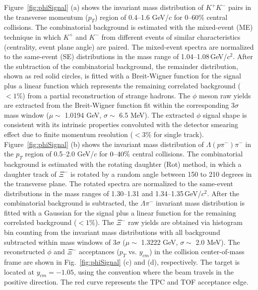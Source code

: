 \documentclass[aps,tightenlines,superscriptaddress,twocolumn]{revtex4-1}
\begin{document}
Figure~\ref{fig:phiSignal} (a) shows the invariant mass distribution of $K^+K^-$ pairs in the transverse momentum ($p_{T}$) region of 0.4--1.6 GeV/$c$ for 0--60\% central collisions. The combinatorial background is estimated with the mixed-event (ME) technique in which $K^+$ and $K^-$ from different events of similar characteristics (centrality, event plane angle) are paired. The mixed-event spectra are normalized to the same-event (SE) distributions in the mass range of 1.04--1.08\,GeV/$c^2$. After the subtraction of the combinatorial background, the remainder distribution, shown as red solid circles, 
is fitted with a Breit-Wigner function for the signal plus a linear function which represents the remaining correlated background ($< 1\%$) from a partial reconstruction of strange hadrons. The $\phi$ meson raw yields are extracted from the Breit-Wigner function fit within the corresponding 3$\sigma$ mass window ($\mu\sim$ 1.0194 GeV, $\sigma\sim$ 6.5 MeV). The extracted $\phi$ signal shape is consistent with its intrinsic properties convoluted with the detector smearing effect due to finite momentum resolution ($<3\%$ for single track).
Figure~\ref{fig:phiSignal} (b) shows the invariant mass distribution of $\Lambda(p\pi^-)\pi^-$ in the $p_{T}$ region of 0.5--2.0 GeV/$c$ for $\textup{0--40\%}$ central collisions. The combinatorial background is estimated with the rotating daughter (Rot) method, in which a daughter track of $\Xi^-$ is rotated by a random angle between 150 to 210 degrees in the transverse plane. The rotated spectra are normalized to the same-event distributions in the mass ranges of 1.30--1.31 and 1.34--1.35\,GeV/$c^2$. After the combinatorial background is subtracted, the $\Lambda\pi^-$ invariant mass distribution is fitted with a Gaussian for the signal plus a linear function for the remaining correlated background ($< 1\%$). The $\Xi^-$ raw yields are obtained via histogram bin counting from the invariant mass distributions with all background subtracted within mass windows of 3$\sigma$ ($\mu\sim$ 1.3222 GeV, $\sigma\sim$ 2.0 MeV). The reconstructed $\phi$ and $\Xi^-$ acceptances ($p_T$ vs. $y_{cm}$) in the collision center-of-mass frame are shown in Fig.~\ref{fig:phiSignal} (c) and (d), respectively.
The target is located at $y_{cm} = -1.05$, using the convention where the beam travels in the positive direction. The red curve represents the TPC and TOF acceptance edge. %
\end{document}
